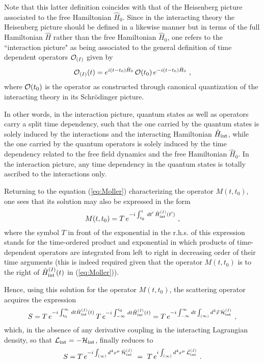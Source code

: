 \documentclass[a4paper,11pt]{article}
\begin{document}
Note that this latter definition coincides with that of the Heisenberg
picture associated to the free Hamiltonian $\hat{H}_0$. Since in the
interacting theory the Heisenberg picture should be defined
in a likewise manner but in terms of the full Hamiltonian $\hat{H}$ rather
than the free Hamiltonian $\hat{H}_0$, one refers to the ``interaction 
picture" as being associated to the general definition of time dependent 
operators ${\cal O}_{(I)}$ given by
\begin{equation}
{\cal O}_{(I)}(t)=e^{i(t-t_0)\hat{H}_0}\,{\cal O}(t_0)\,
e^{-i(t-t_0)\hat{H}_0}\ ,
\end{equation}
where ${\cal O}(t_0)$ is the operator as constructed through canonical 
quantization of the interacting theory in its Schr\"odinger picture. 

In other words, in the interaction picture, quantum states as well as 
ope\-ra\-tors carry a split time dependency, such that the one carried by the 
quantum states is solely induced by the interactions and the interacting 
Hamiltonian $\hat{H}_{\rm int}$, while the one carried by the quantum 
operators is solely induced by the time dependency related to the free 
field dynamics and the free Hamiltonian $\hat{H}_0$. In the interaction 
picture, any time dependency in the quantum states is totally ascribed to 
the interactions only.

Returning to the equation (\ref{eq:Moller}) characterizing the operator 
$M(t,t_0)$, one sees that its solution may also be expressed in the form
\begin{equation}
M(t,t_0)=T\,e^{-i\int_{t_0}^t\,dt'\,\hat{H}^{(I)}_{\rm int}(t')}\ ,
\end{equation}
where the symbol $T$ in front of the exponential in the r.h.s. of this
expression stands for the time-ordered product and exponential in which 
products of time-dependent operators are integrated from left to right in
decreasing order of their time arguments (this is indeed required given
that the operator $M(t,t_0)$ is to the right of $\hat{H}^{(I)}_{\rm int}(t)$
in (\ref{eq:Moller})). 

Hence, using this solution for the operator
$M(t,t_0)$, the scattering ope\-ra\-tor acquires the expression
\begin{equation}
S=T\,e^{-i\int_{t_0}^\infty\,dt\hat{H}^{(I)}_{\rm int}(t)}\,
T\,e^{-i\int_{-\infty}^{t_0}\,dt\hat{H}^{(I)}_{\rm int}(t)}=
T\,e^{-i\int_{-\infty}^\infty dt\int_{(\infty)}d^3\vec{x}\,
\hat{\cal H}^{(I)}_{\rm int}}\ ,
\label{eq:ST}
\end{equation}
which, in the absence of any derivative coupling in the interacting Lagrangian
density, so that ${\cal L}_{\rm int}=-{\cal H}_{\rm int}$, finally reduces to
\begin{equation}
S=T\,e^{-i\int_{(\infty)}d^4x^\mu\,\hat{\cal H}^{(I)}_{\rm int}}\ =\
T\,e^{i\int_{(\infty)}d^4x^\mu\,\hat{\cal L}^{(I)}_{\rm int}}\ .
\end{equation}
\end{document}
